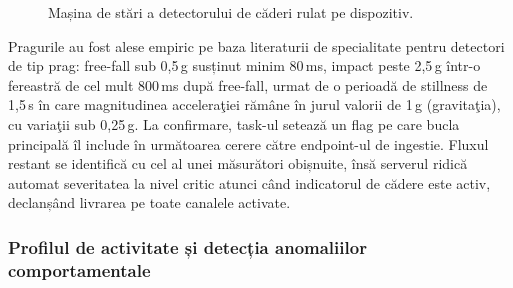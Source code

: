 ﻿\documentclass[12pt,a4paper,twoside]{article}
\begin{document}
\begin{figure}[H]
\centering
{}
\caption{Mașina de stări a detectorului de căderi rulat pe dispozitiv.}
\label{fig:fall-state}
\end{figure}

Pragurile au fost alese empiric pe baza literaturii de specialitate pentru detectori de tip prag: free-fall sub 0,5\,g susținut minim 80\,ms, impact peste 2,5\,g într-o fereastră de cel mult 800\,ms după free-fall, urmat de o perioadă de stillness de 1,5\,s în care magnitudinea acceleraţiei rămâne în jurul valorii de 1\,g (gravitaţia), cu variaţii sub 0,25\,g. La confirmare, task-ul setează un flag pe care bucla principală îl include în următoarea cerere către endpoint-ul de ingestie. Fluxul restant se identifică cu cel al unei măsurători obișnuite, însă serverul ridică automat severitatea la nivel critic atunci când indicatorul de cădere este activ, declanșând livrarea pe toate canalele activate.

\subsubsection{Profilul de activitate și detecția anomaliilor comportamentale}
\end{document}
